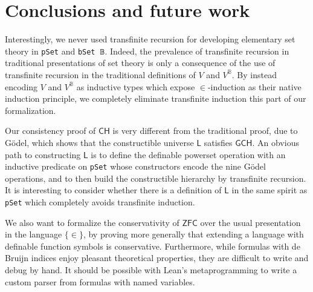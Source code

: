 \documentclass[sigplan,10pt,review, anonymous]{acmart}
\newcommand{\lil}{\lstinline}
\newcommand{\CH}{\mathsf{CH}}
\theoremstyle{definition}
\begin{document}
\section{Conclusions and future work}
\label{sect:conclusions}

Interestingly, we never used transfinite recursion for developing elementary set theory in \lil{pSet} and \lil{bSet 𝔹}. Indeed, the prevalence of transfinite recursion in traditional presentations of set theory is only a consequence of the use of transfinite recursion in the traditional definitions of \(V\) and \(V^{\mathbb{B}}\). By instead encoding \(V\) and \(V^{\mathbb{B}}\) as inductive types which expose \(\in\)-induction as their native induction principle, we completely eliminate transfinite induction this part of our formalization. %

Our consistency proof of \(\CH\) is very different from the traditional proof, due to G\"odel, which shows that the constructible universe \(\mathsf{L}\) satisfies \(\mathsf{GCH}\). An obvious path to constructing \(\mathsf{L}\) is to define the definable powerset operation with an inductive predicate on \lil{pSet} whose constructors encode the nine G\"odel operations, and to then build the constructible hierarchy by transfinite recursion. It is interesting to consider whether there is a definition of \(\mathsf{L}\) in the same spirit as \lil{pSet} which completely avoids transfinite induction.

We also want to formalize the conservativity of \(\mathsf{ZFC}\) over the usual presentation in the language \(\{\in\}\), by proving more generally that extending a language with definable function symbols is conservative.
Furthermore, while formulas with de Bruijn indices enjoy pleasant theoretical properties, they are difficult to write and debug by hand. It should be possible with Lean's metaprogramming to write a custom parser from formulas with named variables.
\end{document}
